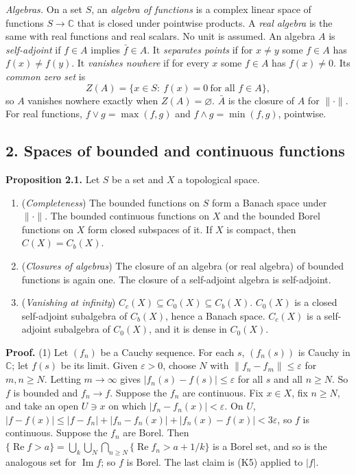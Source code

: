 \documentclass[
  english,
  11pt,
  a4paper,
]{article}
\providecommand{\tightlist}{%
  \setlength{\itemsep}{0pt}\setlength{\parskip}{0pt}}
\begin{document}
\emph{Algebras.} On a set \(S\), an \emph{algebra of functions} is a
complex linear space of functions \(S\to\mathbb C\) that is closed under
pointwise products. A \emph{real algebra} is the same with real
functions and real scalars. No unit is assumed. An algebra \(A\) is
\emph{self-adjoint} if \(f\in A\) implies \(\bar f\in A\). It
\emph{separates points} if for \(x\neq y\) some \(f\in A\) has
\(f(x)\neq f(y)\). It \emph{vanishes nowhere} if for every \(x\) some
\(f\in A\) has \(f(x)\neq0\). Its \emph{common zero set} is
\[Z(A)=\{x\in S:\ f(x)=0\ \text{for all }f\in A\},\] so \(A\) vanishes
nowhere exactly when \(Z(A)=\varnothing\). \(\bar A\) is the closure of
\(A\) for \(\|\cdot\|\). For real functions, \(f\vee g=\max(f,g)\) and
\(f\wedge g=\min(f,g)\), pointwise.

\subsection[2. Spaces of bounded and continuous
functions]{\texorpdfstring{\protect\hypertarget{the-stone-weierstrass-theorem-for-functions-vanishing-at-infinity--oa-fnd-sw-01}{}{}2.
Spaces of bounded and continuous
functions}{2. Spaces of bounded and continuous functions}}\label{the-stone-weierstrass-theorem-for-functions-vanishing-at-infinity--OA-FND-SW-01}

\textbf{Proposition 2.1.} Let \(S\) be a set and \(X\) a topological
space.

\begin{enumerate}
\tightlist
\item
  (\emph{Completeness}) The bounded functions on \(S\) form a Banach
  space under \(\|\cdot\|\). The bounded continuous functions on \(X\)
  and the bounded Borel functions on \(X\) form closed subspaces of it.
  If \(X\) is compact, then \(C(X)=C_b(X)\).
\item
  (\emph{Closures of algebras}) The closure of an algebra (or real
  algebra) of bounded functions is again one. The closure of a
  self-adjoint algebra is self-adjoint.
\item
  (\emph{Vanishing at infinity})
  \(C_c(X)\subseteq C_0(X)\subseteq C_b(X)\). \(C_0(X)\) is a closed
  self-adjoint subalgebra of \(C_b(X)\), hence a Banach space.
  \(C_c(X)\) is a self-adjoint subalgebra of \(C_0(X)\), and it is dense
  in \(C_0(X)\).
\end{enumerate}

\textbf{Proof.} (1) Let \((f_n)\) be a Cauchy sequence. For each \(s\),
\((f_n(s))\) is Cauchy in \(\mathbb C\); let \(f(s)\) be its limit.
Given \(\varepsilon>0\), choose \(N\) with
\(\|f_n-f_m\|\leq\varepsilon\) for \(m,n\geq N\). Letting \(m\to\infty\)
gives \(|f_n(s)-f(s)|\leq\varepsilon\) for all \(s\) and all
\(n\geq N\). So \(f\) is bounded and \(f_n\to f\). Suppose the \(f_n\)
are continuous. Fix \(x\in X\), fix \(n\geq N\), and take an open
\(U\ni x\) on which \(|f_n-f_n(x)|<\varepsilon\). On \(U\),
\(|f-f(x)|\leq|f-f_n|+|f_n-f_n(x)|+|f_n(x)-f(x)|<3\varepsilon\), so
\(f\) is continuous. Suppose the \(f_n\) are Borel. Then
\(\{\operatorname{Re}f>a\}=\bigcup_k\bigcup_N\bigcap_{n\geq N}\{\operatorname{Re}f_n>a+1/k\}\)
is a Borel set, and so is the analogous set for \(\operatorname{Im}f\);
so \(f\) is Borel. The last claim is (K5) applied to \(|f|\).
\end{document}
